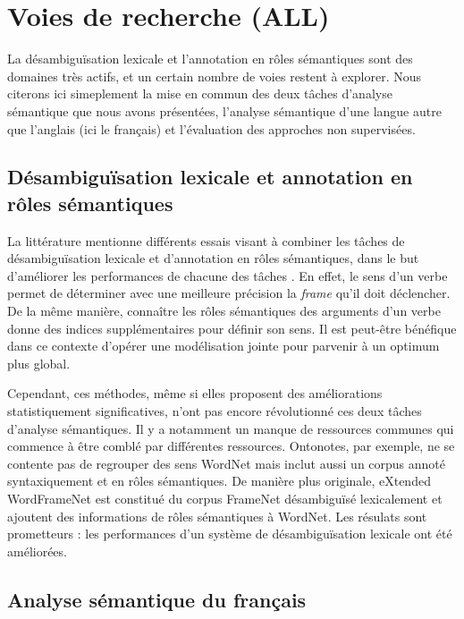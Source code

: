 \section{Voies de recherche (ALL)}

La désambiguïsation lexicale et l'annotation en rôles sémantiques sont des
domaines très actifs, et un certain nombre de voies restent à explorer. Nous
citerons ici simeplement la mise en commun des deux tâches d'analyse sémantique
que nous avons présentées, l'analyse sémantique d'une langue autre que
l'anglais (ici le français) et l'évaluation des approches non supervisées.

\subsection{Désambiguïsation lexicale et annotation en rôles sémantiques}

La littérature mentionne différents essais visant à combiner les tâches de
désambiguïsation lexicale et d'annotation en rôles sémantiques, dans le but
d'améliorer les performances de chacune des tâches
\citep{dang2005role,moreda2006role,che2010jointly}. En effet, le sens d'un
verbe permet de déterminer avec une meilleure précision la \textit{frame} qu'il
doit déclencher. De la même manière, connaître les rôles sémantiques des
arguments d'un verbe donne des indices supplémentaires pour définir son sens.
Il est peut-être bénéfique dans ce contexte d'opérer une modélisation jointe
pour parvenir à un optimum plus global.

Cependant, ces méthodes, même si elles proposent des améliorations
statistiquement significatives, n'ont pas encore révolutionné ces deux tâches
d'analyse sémantiques. Il y a notamment un manque de ressources communes qui
commence à être comblé par différentes ressources. Ontonotes, par exemple, ne
se contente pas de regrouper des sens WordNet mais inclut aussi un corpus
annoté syntaxiquement et en rôles sémantiques. De manière plus originale,
eXtended WordFrameNet \citep{laparra2010extended} est constitué du corpus
FrameNet désambiguïsé lexicalement et ajoutent des informations de rôles
sémantiques à WordNet. Les résulats sont prometteurs : les performances d'un
système de désambiguïsation lexicale ont été améliorées.

\subsection{Analyse sémantique du français}

